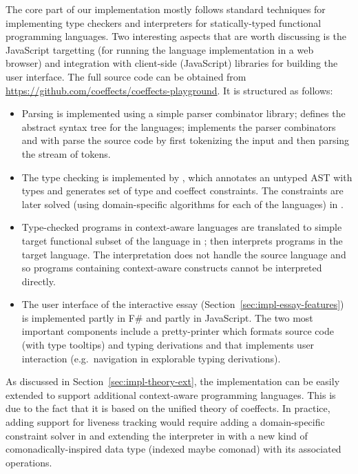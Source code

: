 The core part of our implementation mostly follows standard techniques for implementing type
checkers and interpreters for statically-typed functional programming languages. Two interesting
aspects that are worth discussing is the JavaScript targetting (for running the language
implementation in a web browser) and integration with client-side (JavaScript) libraries for
building the user interface. The full source code can be obtained from
\url{https://github.com/coeffects/coeffects-playground}. It is structured as follows:
%
\begin{itemize}
\item Parsing is implemented using a simple parser combinator library;  defines the
  abstract syntax tree for the languages;  implements the parser combinators
  and  with  parse the source code by first tokenizing
  the input and then parsing the stream of tokens.

\item The type checking is implemented by , which annotates an untyped AST
  with types and generates set of type and coeffect constraints. The constraints are later solved
  (using domain-specific algorithms for each of the languages) in .

\item Type-checked programs in context-aware languages are translated to simple target
  functional subset of the language in ;  then interprets
  programs in the target language. The interpretation does not handle the source
  language and so programs containing context-aware constructs cannot be interpreted directly.

\item The user interface of the interactive essay (Section~\ref{sec:impl-essay-features})
  is implemented partly in F\# and partly in JavaScript. The two most important components include
  a pretty-printer  which formats source code (with type tooltips) and typing
  derivations and  that implements user interaction (e.g.~navigation in explorable
  typing derivations).
\end{itemize}

\noindent
As discussed in Section~\ref{sec:impl-theory-ext}, the implementation can be easily extended to
support additional context-aware programming languages. This is due to the fact that it is based
on the unified theory of coeffects. In practice, adding support for liveness tracking would
require adding a domain-specific constraint solver in  and extending the
interpreter in  with a new kind of comonadically-inspired data type
(indexed maybe comonad) with its associated operations.


